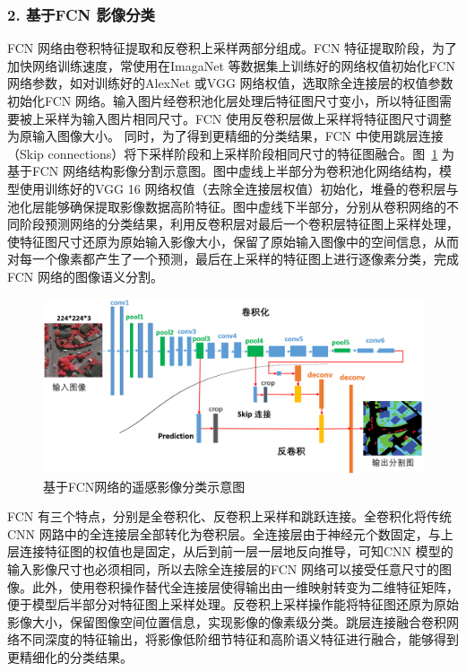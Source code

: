 \subsubsection*{2. 基于FCN 影像分类}
\label{subsec:chap02-2-2-2}
FCN 网络由卷积特征提取和反卷积上采样两部分组成。FCN 特征提取阶段，为了加快网络训练速度，常使用在ImagaNet 等数据集上训练好的网络权值初始化FCN 网络参数，如对训练好的AlexNet\cite{krizhevsky2012imagenet} 或VGG\cite{simonyan2014very} 网络权值，选取除全连接层的权值参数初始化FCN 网络。输入图片经卷积池化层处理后特征图尺寸变小，所以特征图需要被上采样为输入图片相同尺寸。FCN 使用反卷积层做上采样将特征图尺寸调整为原输入图像大小。 同时，为了得到更精细的分类结果，FCN 中使用跳层连接（Skip connections）将下采样阶段和上采样阶段相同尺寸的特征图融合。图~\ref{fig:vgg-fcn} 为基于FCN 网络结构影像分割示意图。图中虚线上半部分为卷积池化网络结构，模型使用训练好的VGG 16 网络权值（去除全连接层权值）初始化，堆叠的卷积层与池化层能够确保提取影像数据高阶特征。图中虚线下半部分，分别从卷积网络的不同阶段预测网络的分类结果，利用反卷积层对最后一个卷积层特征图上采样处理，使特征图尺寸还原为原始输入影像大小，保留了原始输入图像中的空间信息，从而对每一个像素都产生了一个预测，最后在上采样的特征图上进行逐像素分类，完成FCN 网络的图像语义分割。

\begin{figure}[htb]
  \centering
  \includegraphics[width=1.0\textwidth]{figures/vgg-fcn}
  \caption{基于FCN网络的遥感影像分类示意图}\label{fig:vgg-fcn}
\end{figure}

FCN 有三个特点，分别是全卷积化、反卷积上采样和跳跃连接。全卷积化将传统CNN 网路中的全连接层全部转化为卷积层。全连接层由于神经元个数固定，与上层连接特征图的权值也是固定，从后到前一层一层地反向推导，可知CNN 模型的输入影像尺寸也必须相同，所以去除全连接层的FCN 网络可以接受任意尺寸的图像。此外，使用卷积操作替代全连接层使得输出由一维映射转变为二维特征矩阵，便于模型后半部分对特征图上采样处理。反卷积上采样操作能将特征图还原为原始影像大小，保留图像空间位置信息，实现影像的像素级分类。跳层连接融合卷积网络不同深度的特征输出，将影像低阶细节特征和高阶语义特征进行融合，能够得到更精细化的分类结果。

